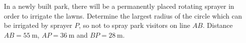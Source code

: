 In a newly built park, there will be a permanently placed rotating sprayer in order to irrigate the lawns. Determine the largest radius of the circle which can be irrigated by sprayer $P$, so not to spray park visitors on line $AB$. Distance $AB = \SI{55}{\m}$, $AP = \SI{36}{\m}$ and $BP = \SI{28}{\m}$.
